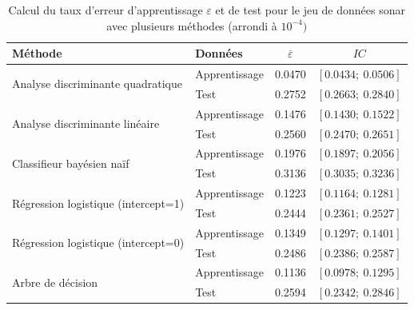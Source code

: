 \documentclass[a4paper,11pt,oneside,roman]{article}
\begin{document}
\begin{table}[H]
\centering

\begin{tabular}{l|l|cc}
\multicolumn{1}{l|}{\textbf{Méthode}}    & \textbf{Données} &$ \overline{\varepsilon}$ & $IC$                      \\ \hline
\multirow{2}{*}{Analyse discriminante quadratique} & Apprentissage    & 0.0470                   & $\left[0.0434 ;~ 0.0506 \right]$  \\
                                       & Test             & 0.2752             & $\left[0.2663  ;~ 0.2840 \right]$ \\ \hline
\multirow{2}{*}{Analyse discriminante linéaire}                  & Apprentissage & 0.1476                                 & $\left[0.1430 ;~ 0.1522 \right]$  \\
                                       & Test             & 0.2560                       & $\left[0.2470  ;~0.2651 \right]$ \\ \hline
\multirow{2}{*}{Classifieur bayésien naïf}                  & Apprentissage    &  0.1976                             & $\left[0.1897 ;~ 0.2056 \right]$  \\
                                       & Test             & 0.3136                                 & $\left[0.3035 ;~ 0.3236 \right]$ \\ \hline
\multirow{2}{*}{Régression logistique (intercept=1)}                  & Apprentissage    &  0.1223                             & $\left[ 0.1164 ;~ 0.1281 \right]$  \\
                                       & Test             & 0.2444                                 & $\left[0.2361;~ 0.2527 \right]$ \\ \hline
\multirow{2}{*}{Régression logistique (intercept=0)}                  & Apprentissage    &  0.1349                           & $\left[0.1297 ;~ 0.1401 \right]$  \\
                                       & Test             & 0.2486                                & $\left[0.2386 ;~ 0.2587 \right]$ \\ \hline
\multirow{2}{*}{Arbre de décision}                  & Apprentissage    &  0.1136                             & $\left[0.0978 ;~  0.1295 \right]$  \\
                                       & Test             & 0.2594                                 & $\left[0.2342 ;~ 0.2846 \right]$ 
\end{tabular}

\caption{Calcul du taux d'erreur d'apprentissage $\varepsilon$ et de test pour le jeu de données sonar avec plusieurs méthodes (arrondi à $10^{-4})$}
\label{sonar}
\end{table}
\end{document}

